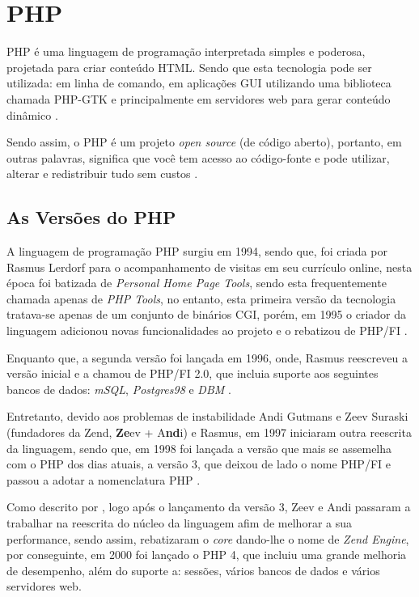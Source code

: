 \section{PHP}

\acs{PHP} é uma linguagem de programação interpretada simples e poderosa,
projetada para criar conteúdo \acs{HTML}. Sendo que esta tecnologia pode ser
utilizada: em linha de comando, em aplicações \ac{GUI} utilizando uma biblioteca
chamada \acs{PHP-GTK} e principalmente em servidores web para gerar conteúdo
dinâmico \cite{programmingPhp}.

Sendo assim, o \acs{PHP} é um projeto \textit{open source} (de código aberto),
portanto, em outras palavras, significa que você tem acesso ao código-fonte e
pode utilizar, alterar e redistribuir tudo sem custos \cite{phpAndMysqlWebDevelopment}.

\subsection{As Versões do PHP}

A linguagem de programação \acs{PHP} surgiu em 1994, sendo que, foi criada por
Rasmus Lerdorf para o acompanhamento de visitas em seu currículo online, nesta
época foi batizada de \textit{Personal Home Page Tools}, sendo esta
frequentemente chamada apenas de \textit{PHP Tools}, no entanto, esta primeira
versão da tecnologia tratava-se apenas de um conjunto de binários \ac{CGI},
porém, em 1995 o criador da linguagem adicionou novas funcionalidades ao projeto
e o rebatizou de \ac{PHP/FI} \cite{phpProgramandoComOrientacaoAObjetos}.

Enquanto que, a segunda versão foi lançada em 1996, onde, 
Rasmus reescreveu a versão inicial e a chamou de \acs{PHP/FI} 2.0, que incluia 
suporte aos seguintes bancos de dados: \textit{mSQL},
\textit{Postgres98} e \textit{DBM} \cite{programmingPhp}.

Entretanto, devido aos problemas de instabilidade Andi Gutmans e Zeev
Suraski (fundadores da \acs{Zend}, \textbf{Ze}ev + A\textbf{nd}i) e Rasmus, em
1997 iniciaram outra reescrita da linguagem, sendo que, em 1998 foi lançada a versão
que mais se assemelha com o \acs{PHP} dos dias atuais, a versão 3, que deixou
de lado o nome \acs{PHP/FI} e passou a adotar a nomenclatura \ac{PHP}
\cite{websitePHPHistoria}.

Como descrito por , logo após o
lançamento da versão 3, Zeev e Andi passaram a trabalhar na reescrita do núcleo da 
linguagem afim de melhorar a sua performance, sendo assim, rebatizaram o
\textit{core} dando-lhe o nome de \textit{Zend Engine}, por conseguinte, em
2000 foi lançado o \acs{PHP} 4, que incluiu uma grande melhoria de desempenho, 
além do suporte a: sessões, vários bancos de dados e vários servidores web.

